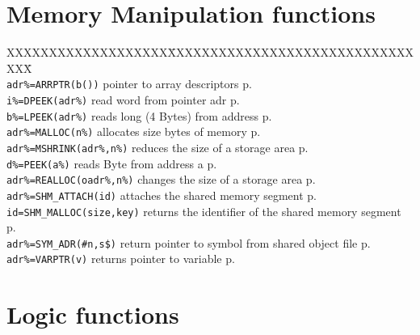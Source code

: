 \section{Memory Manipulation functions}
\begin{tabbing}
XXXXXXXXXXXXXXXXXXX\=XXXXXXXXXXXXXXXXXXXXXXXXXXXXXXXX\=\kill\\
\verb|adr%=ARRPTR(b())|  	\> pointer to array descriptors\> p.\pageref{ARRPTR}\\
\verb|i%=DPEEK(adr%)|	\>  read word from pointer adr\> p.\pageref{DPEEK}\\
\verb|b%=LPEEK(adr%)|  	\>reads long (4 Bytes) from address\> p.\pageref{LPEEK}\\
\verb|adr%=MALLOC(n%)| \> allocates size bytes of memory \> p.\pageref{MALLOC}\\
\verb|adr%=MSHRINK(adr%,n%)| \> reduces  the  size  of  a  storage  area \> p.\pageref{MSHRINK}\\
\verb|d%=PEEK(a%)| \>	 reads Byte from address a\> p.\pageref{PEEK}\\
\verb|adr%=REALLOC(oadr%,n%)| \> changes the size  of  a  storage  area \> p.\pageref{REALLOC}\\
\verb|adr%=SHM_ATTACH(id)| \> attaches the shared memory segment \> p.\pageref{SHMiATTACH}\\
\verb|id=SHM_MALLOC(size,key)| \> returns the identifier of the shared memory segment \> p.\pageref{SHMiMALLOC}\\
\verb|adr%=SYM_ADR(#n,s$)| \>return pointer to symbol from shared object file\> p.\pageref{SYMiADR}\\
\verb|adr%=VARPTR(v)| \>returns pointer to variable\> p.\pageref{VARPTR}\\
\end{tabbing}

\section{Logic functions}

